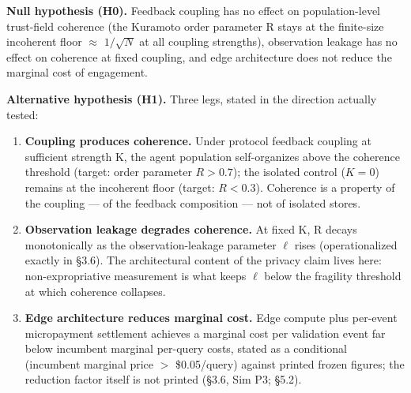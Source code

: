 \documentclass[
]{article}
\begin{document}
\textbf{Null hypothesis (H0).} Feedback coupling has no effect on
population-level trust-field coherence (the Kuramoto order parameter R
stays at the finite-size incoherent floor \(\approx\) \(1/\sqrt{N}\) at
all coupling strengths), observation leakage has no effect on coherence
at fixed coupling, and edge architecture does not reduce the marginal
cost of engagement.

\textbf{Alternative hypothesis (H1).} Three legs, stated in the
direction actually tested:

\begin{enumerate}
\def\labelenumi{\arabic{enumi}.}
\item
  \textbf{Coupling produces coherence.} Under protocol feedback coupling
  at sufficient strength K, the agent population self-organizes above
  the coherence threshold (target: order parameter \(R > 0.7\)); the
  isolated control (\(K = 0\)) remains at the incoherent floor (target:
  \(R < 0.3\)). Coherence is a property of the coupling --- of the
  feedback composition --- not of isolated stores.
\item
  \textbf{Observation leakage degrades coherence.} At fixed K, R decays
  monotonically as the observation-leakage parameter \(\ell\) rises
  (operationalized exactly in §3.6). The architectural content of the
  privacy claim lives here: non-expropriative measurement is what keeps
  \(\ell\) below the fragility threshold at which coherence collapses.
\item
  \textbf{Edge architecture reduces marginal cost.} Edge compute plus
  per-event micropayment settlement achieves a marginal cost per
  validation event far below incumbent marginal per-query costs, stated
  as a conditional (incumbent marginal price \(>\) \$0.05/query) against
  printed frozen figures; the reduction factor itself is not printed
  (§3.6, Sim P3; §5.2).
\end{enumerate}
\end{document}
